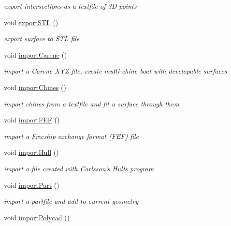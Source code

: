 \begin{DoxyCompactItemize}
\begin{DoxyCompactList}\small\item\em export intersections as a textfile of 3\-D points \end{DoxyCompactList}\item 
void \hyperlink{classShipCAD_1_1Controller_a11a8473f84eeed35f9f48c119da16351}{export\-S\-T\-L} ()
\begin{DoxyCompactList}\small\item\em export surface to S\-T\-L file \end{DoxyCompactList}\item 
void \hyperlink{classShipCAD_1_1Controller_aef735cfaf32fe83bf1091f9323e7061b}{import\-Carene} ()
\begin{DoxyCompactList}\small\item\em import a Carene X\-Y\-Z file, create multi-\/chine boat with developable surfaces \end{DoxyCompactList}\item 
void \hyperlink{classShipCAD_1_1Controller_a589baec274c41aef111fed029cc1f347}{import\-Chines} ()
\begin{DoxyCompactList}\small\item\em import chines from a textfile and fit a surface through them \end{DoxyCompactList}\item 
void \hyperlink{classShipCAD_1_1Controller_a1e36fc51758f120731b0ff79855fab05}{import\-F\-E\-F} ()
\begin{DoxyCompactList}\small\item\em import a Freeship exchange format (F\-E\-F) file \end{DoxyCompactList}\item 
void \hyperlink{classShipCAD_1_1Controller_a0ce9a5b0d89230deea8a85cd32ec24da}{import\-Hull} ()
\begin{DoxyCompactList}\small\item\em import a file created with Carlsson's Hulls program \end{DoxyCompactList}\item 
void \hyperlink{classShipCAD_1_1Controller_aa17d0e883689538500f2bac63c0d1736}{import\-Part} ()
\begin{DoxyCompactList}\small\item\em import a partfile and add to current geometry \end{DoxyCompactList}\item 
void \hyperlink{classShipCAD_1_1Controller_a7ec129046c11bd2be6cc388ca85206ce}{import\-Polycad} ()

\end{DoxyCompactItemize}
